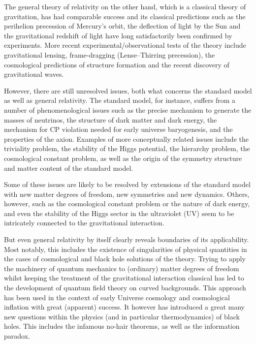 \documentclass[11pt]{book} %
\numberwithin{equation}{chapter}
\begin{document}
The general theory of relativity on the other hand, which is a classical theory of gravitation,
has had comparable success and its
classical predictions such as the perihelion precession of Mercury's orbit, the deflection of light by the Sun
and the gravitational redshift of light have long satisfactorily been confirmed by experiments.
More recent experimental/observational tests of the theory include gravitational lensing,
frame-dragging (Lense–Thirring precession),
the cosmological predictions of structure formation
and the recent discovery of gravitational waves.

However, there are still unresolved issues, both what concerns the standard model as well
as general relativity.
The standard model, for instance, suffers from a number of phenomenological issues such as
the precise mechanism to generate the masses of neutrinos,
the structure of dark matter and dark energy,
the mechanism for CP violation needed for early universe baryogenesis,
and the properties of the axion.
Examples of more conceptually related issues include the triviality problem,
the stability of the Higgs potential,
the hierarchy problem,
the cosmological constant problem,
as well as
the origin of the symmetry structure and matter content of the standard model.

Some of these issues are likely to be resolved by extensions of the standard model
with new matter degrees of freedom, new symmetries and new dynamics. Others, however,
such as the cosmological constant problem or the nature of dark energy,
and even the stability of the Higgs sector
in the ultraviolet (UV) seem to be intricately connected to the gravitational interaction.

But even general relativity by itself clearly reveals boundaries of its applicability.
Most notably, this includes the existence of singularities of physical quantities
in the cases of cosmological and black hole solutions of the theory.
Trying to apply the machinery of quantum mechanics to (ordinary) matter degrees of freedom
whilst keeping the treatment of the gravitational interaction classical has led
to the development of quantum field theory on curved backgrounds. This approach has
been used in the context of early Universe cosmology and cosmological inflation with
great (apparent) success. It however has introduced a great many new questions within
the physics (and in particular thermodynamics) of black holes. This includes the
infamous no-hair theorems, as well as the information paradox.
\end{document}
